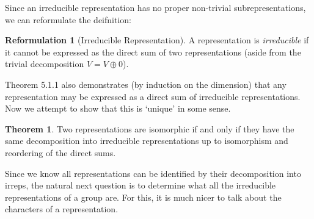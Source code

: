 \documentclass{article}
\theoremstyle{definition}
\newtheorem{reformulation}{Reformulation}[section]
\newtheorem{theorem}{Theorem}[section]
\begin{document}
Since an irreducible representation has no proper non-trivial subrepresentations, we can reformulate the deifnition:
\begin{reformulation}[Irreducible Representation]
    A representation is \textit{irreducible} if it cannot be expressed as the direct sum of two representations (aside from the trivial decomposition $V=V\oplus 0$).
\end{reformulation}
Theorem 5.1.1 also demonstrates (by induction on the dimension) that any representation may be expressed as a direct sum of irreducible representations. Now we attempt to show that this is `unique' in some sense.
\begin{theorem}
    Two representations are isomorphic if and only if they have the same decomposition into irreducible representations up to isomorphism and reordering of the direct sums.
\end{theorem}
Since we know all representations can be identified by their decomposition into irreps, the natural next question is to determine what all the irreducible representations of a group are. For this, it is much nicer to talk about the characters of a representation.
\end{document}
